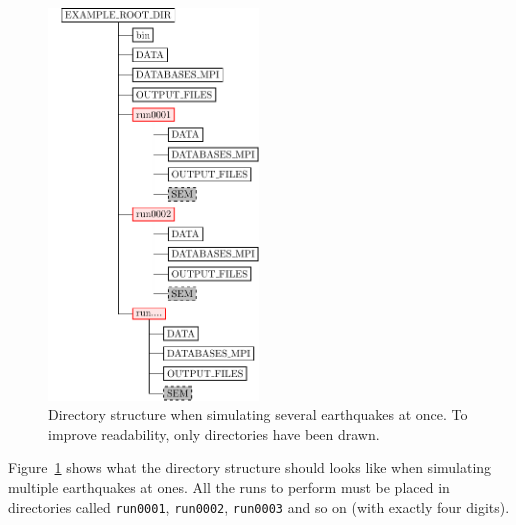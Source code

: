 \begin{figure}[H]
\begin{centering}
\includegraphics[width=2.2in]{figures/simultaneous_dir_struct.pdf}
\par\end{centering}
%
\caption{
Directory structure when simulating several earthquakes at once.
To improve readability, only directories have been drawn.}
\label{fig:simultaneous_dir_struct}
\end{figure}

Figure~\ref{fig:simultaneous_dir_struct} shows what the directory structure
should looks like when simulating multiple earthquakes at ones.
All the runs to perform must be placed in directories called \texttt{run0001}, \texttt{run0002}, \texttt{run0003} and so on (with exactly four digits).

